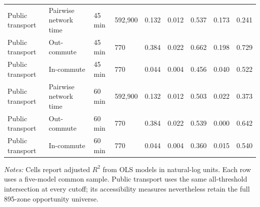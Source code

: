 \begin{landscape}
\begin{table}[htbp]
\begin{tabular}{lllllllll}
Public transport & Pairwise network time & 45 min & 592,900 & 0.132 & 0.012 & 0.537 & 0.173 & 0.241 \\
Public transport & Out-commute & 45 min & 770 & 0.384 & 0.022 & 0.662 & 0.198 & 0.729 \\
Public transport & In-commute & 45 min & 770 & 0.044 & 0.004 & 0.456 & 0.040 & 0.522 \\
Public transport & Pairwise network time & 60 min & 592,900 & 0.132 & 0.012 & 0.503 & 0.022 & 0.373 \\
Public transport & Out-commute & 60 min & 770 & 0.384 & 0.022 & 0.539 & 0.000 & 0.642 \\
Public transport & In-commute & 60 min & 770 & 0.044 & 0.004 & 0.360 & 0.015 & 0.540 \\
\bottomrule
\end{tabular}
\par\vspace{2pt}
\begin{minipage}{0.96\linewidth}\footnotesize\textit{Notes:} Cells report adjusted $R^2$ from OLS models in natural-log units. Each row uses a five-model common sample. Public transport uses the same all-threshold intersection at every cutoff; its accessibility measures nevertheless retain the full 895-zone opportunity universe.
\end{minipage}
\end{table}
\end{landscape}
